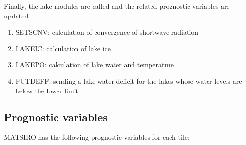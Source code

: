 Finally, the lake modules are called and the related prognostic variables are updated.

\begin{enumerate}
\def\labelenumi{(\alph{enumi})}
\setcounter{enumi}{15}
\tightlist
\item
  SETSCNV: calculation of convergence of shortwave radiation
\item
  LAKEIC: calculation of lake ice
\item
  LAKEPO: calculation of lake water and temperature
\item
  PUTDEFF: sending a lake water deficit for the lakes whose water levels are below the lower limit
\end{enumerate}

\subsection{Prognostic variables}\label{prognostic-variables}

MATSIRO has the following prognostic variables for each tile:

